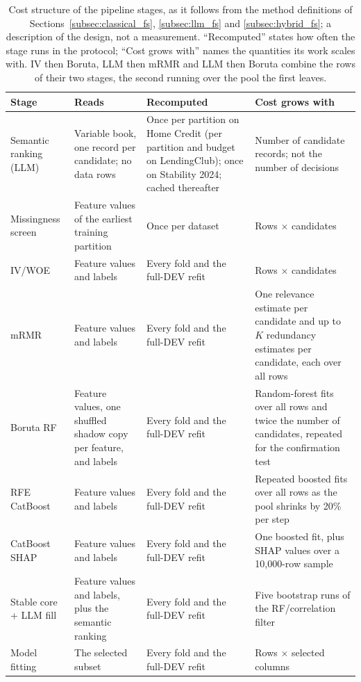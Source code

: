 \documentclass[final,5p,twocolumn]{elsarticle}
\newcommand{\Kfeat}{K}
\begin{document}
\begin{table}[htbp]
\centering
\footnotesize
\setlength{\tabcolsep}{5pt}
\begin{threeparttable}
\caption{Cost structure of the pipeline stages, as it follows from the method definitions of Sections~\ref{subsec:classical_fs}, \ref{subsec:llm_fs} and \ref{subsec:hybrid_fs}; a description of the design, not a measurement. ``Recomputed'' states how often the stage runs in the protocol; ``Cost grows with'' names the quantities its work scales with. IV then Boruta, LLM then mRMR and LLM then Boruta combine the rows of their two stages, the second running over the pool the first leaves.}
\label{tab:cost_structure}
\begin{tabular}{@{}L{27mm}L{42mm}L{40mm}L{\dimexpr\textwidth-109mm-6\tabcolsep\relax}@{}}
\toprule
Stage & Reads & Recomputed & Cost grows with \\
\midrule
Semantic ranking (LLM) & Variable book, one record per candidate; no data rows & Once per partition on Home Credit (per partition and budget on LendingClub); once on Stability 2024; cached thereafter & Number of candidate records; not the number of decisions \\
\addlinespace
Missingness screen & Feature values of the earliest training partition & Once per dataset & Rows $\times$ candidates \\
\addlinespace
IV/WOE & Feature values and labels & Every fold and the full-DEV refit & Rows $\times$ candidates \\
\addlinespace
mRMR & Feature values and labels & Every fold and the full-DEV refit & One relevance estimate per candidate and up to $\Kfeat$ redundancy estimates per candidate, each over all rows \\
\addlinespace
Boruta RF & Feature values, one shuffled shadow copy per feature, and labels & Every fold and the full-DEV refit & Random-forest fits over all rows and twice the number of candidates, repeated for the confirmation test \\
\addlinespace
RFE CatBoost & Feature values and labels & Every fold and the full-DEV refit & Repeated boosted fits over all rows as the pool shrinks by 20\% per step \\
\addlinespace
CatBoost SHAP & Feature values and labels & Every fold and the full-DEV refit & One boosted fit, plus SHAP values over a 10,000-row sample \\
\addlinespace
Stable core + LLM fill & Feature values and labels, plus the semantic ranking & Every fold and the full-DEV refit & Five bootstrap runs of the RF/correlation filter \\
\addlinespace
Model fitting & The selected subset & Every fold and the full-DEV refit & Rows $\times$ selected columns \\
\bottomrule
\end{tabular}
\end{threeparttable}
\end{table}
\end{document}
